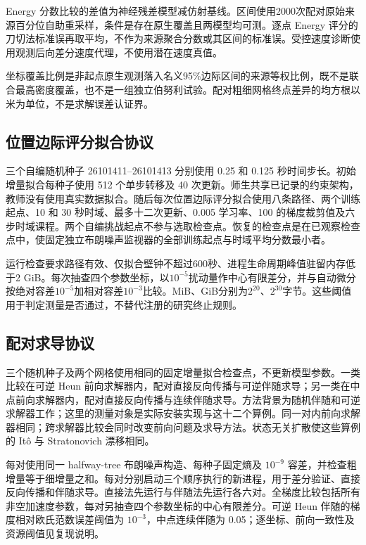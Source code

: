 \documentclass[UTF8,11pt]{ctexart}
\begin{document}
Energy 分数比较的差值为神经残差模型减仿射基线。区间使用2000次配对原始来源百分位自助重采样，条件是存在原生覆盖且两模型均可测。逐点 Energy 评分的刀切法标准误再取平均，不作为来源聚合分数或其区间的标准误。受控速度诊断使用观测后向差分速度代理，不使用潜在速度真值。

坐标覆盖比例是非起点原生观测落入名义95\%边际区间的来源等权比例，既不是联合最高密度覆盖，也不是一组独立伯努利试验。配对粗细网格终点差异的均方根以米为单位，不是求解误差认证界。

\subsection{位置边际评分拟合协议}\label{sec:fit-design}
三个自编随机种子 26101411--26101413 分别使用 0.25 和 0.125 秒时间步长。初始增量拟合每种子使用 512 个单步转移及 40 次更新。师生共享已记录的约束架构，教师没有使用真实数据拟合。随后每次位置边际评分拟合使用八条路径、两个训练起点、10 和 30 秒时域、最多十二次更新、0.005 学习率、100 的梯度裁剪值及六步时域课程。两个自编挑战起点不参与选取检查点。恢复的检查点是在已观察检查点中，使固定独立布朗噪声监视器的全部训练起点与时域平均分数最小者。

运行检查要求路径有效、仅拟合壁钟不超过600秒、进程生命周期峰值驻留内存低于2 GiB。每次抽查四个参数坐标，以$10^{-5}$扰动量作中心有限差分，并与自动微分按绝对容差$10^{-5}$加相对容差$10^{-3}$比较。MiB、GiB分别为$2^{20}$、$2^{30}$字节。这些阈值用于判定测量是否通过，不替代注册的研究终止规则。

\subsection{配对求导协议}\label{sec:gradient-design}
三个随机种子及两个网格使用相同的固定增量拟合检查点，不更新模型参数。一类比较在可逆 Heun 前向求解器内，配对直接反向传播与可逆伴随求导；另一类在中点前向求解器内，配对直接反向传播与连续伴随求导。方法背景为随机伴随和可逆求解器工作\cite{li2020,kidger2021}；这里的测量对象是实际安装实现与这十二个算例。同一对内前向求解器相同；跨求解器比较会同时改变前向问题及求导方法。状态无关扩散使这些算例的 It\^o 与 Stratonovich 漂移相同。

每对使用同一 halfway-tree 布朗噪声构造、每种子固定熵及 $10^{-9}$ 容差，并检查粗增量等于细增量之和。每对分别启动三个顺序执行的新进程，用于差分验证、直接反向传播和伴随求导。直接法先运行与伴随法先运行各六对。全梯度比较包括所有非空加速度参数，每对另抽查四个参数坐标的中心有限差分。可逆 Heun 伴随的梯度相对欧氏范数误差阈值为 $10^{-3}$，中点连续伴随为 0.05；逐坐标、前向一致性及资源阈值见复现说明。
\end{document}
